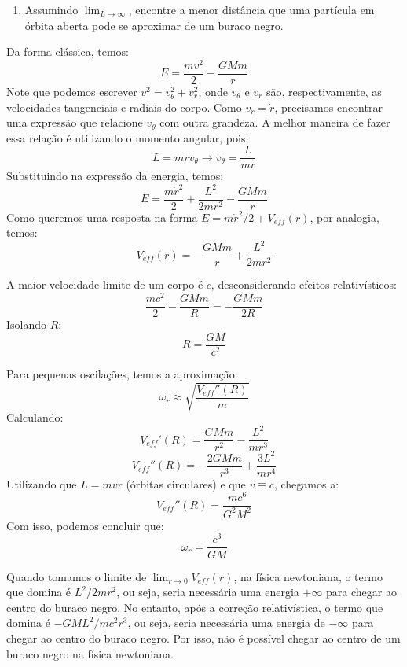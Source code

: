 \documentclass[11pt]{article}
\begin{document}
\begin{pproblem}
\begin{enumerate}[label=\textbf{\alph*)}]
        \item Assumindo \( \lim_{L \to \infty}\), encontre a menor distância que uma partícula em órbita aberta pode se aproximar de um buraco negro.  
    \end{enumerate}
    \begin{pssolution*}{}{}
        \begin{alternativas}
            \item Da forma clássica, temos:
            \[E = \frac{mv^2}{2}-\frac{GMm}{r}\]
            Note que podemos escrever \(v^2 = v_\theta^2+ v_r^2\), onde \(v_\theta\) e \(v_r\) são, respectivamente, as velocidades tangenciais e radiais do corpo. Como \(v_r = \dot{r}\), precisamos encontrar uma expressão que relacione \(v_\theta\) com outra grandeza. A melhor maneira de fazer essa relação é utilizando o momento angular, pois:
            \[L = mrv_\theta \rightarrow v_\theta = \frac{L}{mr}\]
            Substituindo na expressão da energia, temos:
            \[E = \frac{m\dot{r}^2}{2}+\frac{L^2}{2mr^2} - \frac{GMm}{r}\]
            Como queremos uma resposta na forma \(E = m\dot{r}^2/2 + V_{eff}(r)\), por analogia, temos:
            \[\boxed{V_{eff}(r) = -\frac{GMm}{r}+\frac{L^2}{2mr^2}}\]

            \item A maior velocidade limite de um corpo é \(c\), desconsiderando efeitos relativísticos:
            \[\frac{mc^2}{2}-\frac{GMm}{R} = -\frac{GMm}{2R}\]
            Isolando \(R\):
            \[\boxed{R = \frac{GM}{c^2}}\]

            \item Para pequenas oscilações, temos a aproximação:
            \[\omega_r \approx \sqrt{\frac{V_{eff}''(R)}{m}}\]
            Calculando:
            \[V_{eff}'(R) = \frac{GMm}{r^2}-\frac{L^2}{mr^3}\]
            \[V_{eff}''(R) = -\frac{2GMm}{r^3}+\frac{3L^2}{mr^4}\]
            Utilizando que \(L = mvr\) (órbitas circulares) e que \(v\equiv c\), chegamos a:
            \[V_{eff}''(R) = \frac{mc^6}{G^2M^2}\]
            Com isso, podemos concluir que:
            \[\omega_r = \frac{c^3}{GM}\]

            \item Quando tomamos o limite de \(\lim_{r\rightarrow 0}V_{eff}(r)\), na física newtoniana, o termo que domina é \(L^2/2mr^2\), ou seja, seria necessária uma energia \(+\infty\) para chegar ao centro do buraco negro. No entanto, após a correção relativística, o termo que domina é \(-GML^2/mc^2r^3\), ou seja, seria necessária uma energia de \(-\infty\) para chegar ao centro do buraco negro. Por isso, não é possível chegar ao centro de um buraco negro na física newtoniana.
            

\end{alternativas}
\end{pssolution*}
\end{pproblem}
\end{document}
